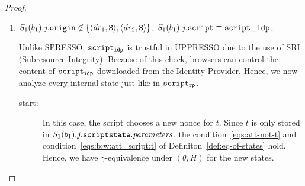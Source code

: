 \begin{proof}
\begin{description}
\begin{description}
\begin{enumerate}
  
          \item $S_1(b_1).j.\mathtt{origin} \not\in 
            \{\langle\mathit{dr}_1,\mathtt{S}\rangle,\langle\mathit{dr}_2,\mathtt{S}\rangle\}$. 
            $S_1(b_1).j.\mathtt{script} \equiv \mathtt{script\_idp}$.
            
            Unlike SPRESSO, $\mathtt{script_{idp}}$ is trustful in
            UPPRESSO due to the use of SRI (Subresource Integrity).
            Because of this check, browsers can control the 
            content of $\mathtt{script_{idp}}$ downloaded from 
            the Identity Provider. Hence, we now analyze every 
            internal state just like in $\mathtt{script_{rp}}$.
  
            \begin{description}
            \item[start:] In this case, the script chooses a
              new nonce for $t$. Since $t$ is only stored in
              $S_1(b_1).j.\mathtt{scriptstate}.\mathit{parameters}$,
              the condition~\ref{eqs:att-not-t} and 
              condition~\ref{eqs:b:w:att_script:t} of 
              Definiton~\ref{def:eq-of-states} hold. Hence, 
              we have $\gamma$-equivalence under $(\theta,H)$ 
              for the new states.
  

\end{description}
\end{enumerate}
\end{description}
\end{description}
\end{proof}
